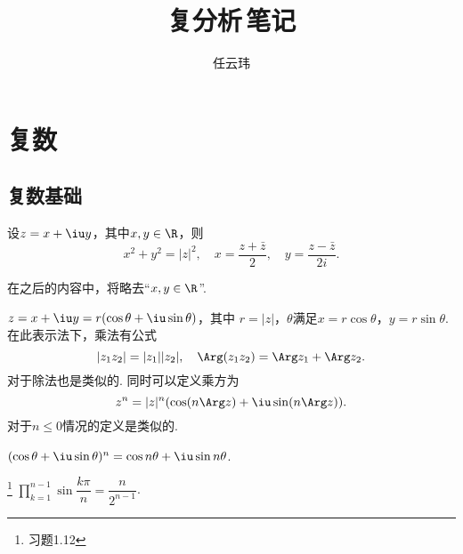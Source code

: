 

\title{复分析$\,$笔记}
\author{任云玮}
\date{}



\maketitle
\tableofcontents
\newpage

\section{复数}

\subsection{复数基础}

  \begin{pos}
    设$z=x+\iu y$，其中$x, y\in\R$，则
    \[
      x^2 + y^2 = |z|^2,\quad x = \frac{z+\bar{z}}{2},\quad
      y = \frac{z-\bar{z}}{2i}.
    \]
  \end{pos}
  \remark
    在之后的内容中，将略去“$x,y\in\R$”.

  \begin{pos}[三角表示法]
    $z = x+\iu y = r(\cos\theta + \iu\sin\theta)$，其中
    $r=|z|$，$\theta$满足$x=r\cos\theta$，$y=r\sin\theta$.
    在此表示法下，乘法有公式
    \[
      |z_1z_2| = |z_1||z_2|,\quad \Arg(z_1z_2) = \Arg z_1 + \Arg z_2.
    \]
    对于除法也是类似的. 同时可以定义乘方为
    \[
      z^n = |z|^n(\cos(n\Arg z) + \iu\sin(n\Arg z)).
    \]
    对于$n\le 0$情况的定义是类似的.
  \end{pos}

  \begin{thm}[Moivre公式]
    \label{thm: Moivre公式}
    $(\cos\theta + \iu\sin\theta)^n = \cos n\theta + \iu\sin n\theta$.
  \end{thm}

  \begin{pos}\footnote{习题1.12}
    $\prod\limits_{k=1}^{n-1}\sin\dfrac{k\pi}{n}=\dfrac{n}{2^{n-1}}$.
  \end{pos}
  \proof
    

